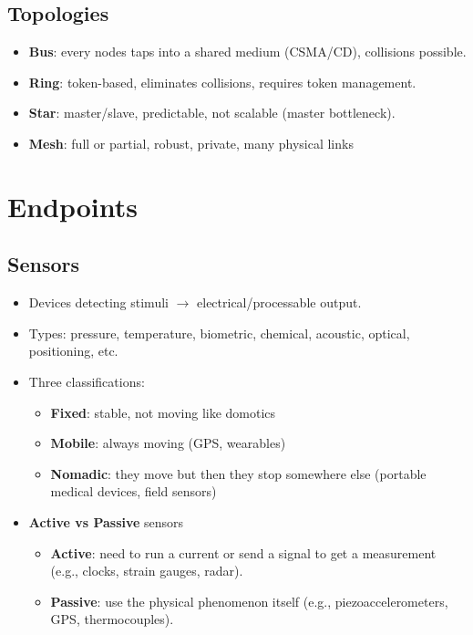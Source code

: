 \subsection{Topologies}
\begin{itemize}
    \item \textbf{Bus}: every nodes taps into a shared medium (CSMA/CD), collisions possible.
    \item \textbf{Ring}: token-based, eliminates collisions, requires token management.
    \item \textbf{Star}: master/slave, predictable, not scalable (master bottleneck).
    \item \textbf{Mesh}: full or partial, robust, private, many physical links
\end{itemize}

\section{Endpoints}

\subsection{Sensors}
\begin{itemize}
    \item Devices detecting stimuli $\rightarrow$ electrical/processable output.
    \item Types: pressure, temperature, biometric, chemical, acoustic, optical, positioning, etc.
    \item Three classifications:
    \begin{itemize}
        \item \textbf{Fixed}: stable, not moving like domotics
        \item \textbf{Mobile}: always moving (GPS, wearables)
        \item \textbf{Nomadic}: they move but then they stop somewhere else (portable medical devices, field sensors)
    \end{itemize}
    \item \textbf{Active vs Passive} sensors
    \begin{itemize}
        \item \textbf{Active}: need to run a current or send a signal to get a measurement (e.g., clocks, strain gauges, radar).
        \item \textbf{Passive}: use the physical phenomenon itself (e.g., piezoaccelerometers, GPS, thermocouples).
    \end{itemize}
\end{itemize}

